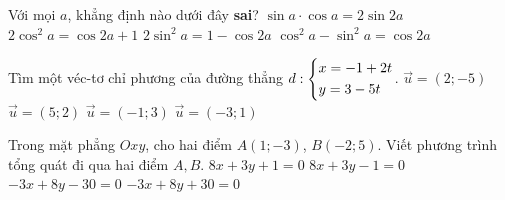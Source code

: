 \begin{ex}%
Với mọi $a$, khẳng định nào dưới đây \textbf{sai}?
\choice
{\True $\sin a\cdot\cos a=2\sin2a$}
{$2\cos^2a=\cos2a+1$}
{$2\sin^2a=1-\cos2a$}
{$\cos^2a-\sin^2a=\cos2a$}
\end{ex}

\begin{ex}%
Tìm một véc-tơ chỉ phương của đường thẳng $d:\left\{\begin{aligned}&x=-1+2t\\&y=3-5t\end{aligned}\right.$.
\choice
{\True $\overrightarrow{u}=\left(2;-5\right)$}
{$\overrightarrow{u}=\left(5;2\right)$}
{$\overrightarrow{u}=\left(-1;3\right)$}
{$\overrightarrow{u}=\left(-3;1\right)$}
\end{ex}

\begin{ex}%
Trong mặt phẳng $Oxy$, cho hai điểm $A(1;-3)$, $B(-2;5)$. Viết phương trình tổng quát đi qua hai điểm $A,B$.
\choice
{\True $8x+3y+1=0$}
{$8x+3y-1=0$}
{$-3x+8y-30=0$}
{$-3x+8y+30=0$}
\end{ex}   

